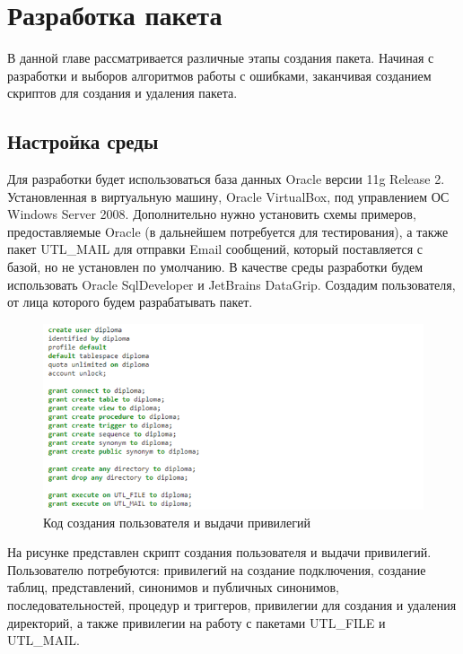 \chapter{Разработка пакета} \label{ch3}

В данной главе рассматривается различные этапы создания пакета. Начиная с разработки и выборов алгоритмов работы с ошибками, заканчивая созданием скриптов для создания и удаления пакета.

 
\section{Настройка среды} \label{ch3:sec1}

Для разработки будет использоваться база данных Oracle версии 11g Release 2. Установленная в виртуальную машину, Oracle VirtualBox, под управлением ОС Windows Server 2008. Дополнительно нужно установить схемы примеров, предоставляемые Oracle (в дальнейшем потребуется для тестирования), а также пакет UTL\_MAIL для отправки Email сообщений, который поставляется с базой, но не установлен по умолчанию. В качестве среды разработки будем использовать Oracle SqlDeveloper и JetBrains DataGrip. Создадим пользователя, от лица которого будем разрабатывать пакет. 

\begin{figure}[ht!] 
	\center
	\includegraphics [scale=1] {my_folder/img/C3_create_user.png}
	\caption{Код создания пользователя и выдачи привилегий} 
	\label{fig:C3_create_user}  
\end{figure}
\FloatBarrier

На рисунке  представлен скрипт создания пользователя и выдачи привилегий. Пользователю потребуются: привилегий на создание подключения, создание таблиц, представлений, синонимов и публичных синонимов, последовательностей, процедур и триггеров, привилегии для создания и удаления директорий, а также привилегии на работу с пакетами UTL\_FILE и UTL\_MAIL. 

